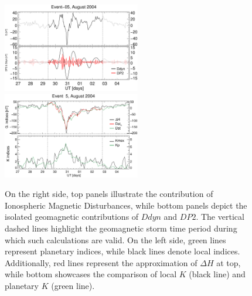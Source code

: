 \documentclass[a4paper,fleqn]{cas-dc}
\begin{document}
\begin{figure}[h!]
       \centerline{\Large \bf   
      \hspace{0.275\textwidth}  \color{black}{}
       \hspace{0.295\textwidth}  \color{black}{}
         \hfill}
    \includegraphics[width=6.0cm]{images/diono/iono_PI_V1_2004-08-27.eps}
    \includegraphics[width=6.0cm]{images/dH_approx/diono_valid_V4_2004-08-27.eps}            
       \caption{On the right side, top panels illustrate the contribution of Ionospheric Magnetic Disturbances, while bottom panels depict the isolated geomagnetic contributions of $Ddyn$ and $DP2$. The vertical dashed lines highlight the geomagnetic storm time period during which such calculations are valid. On the left side, green lines represent planetary indices, while black lines denote local indices. Additionally, red lines represent the approximation of $\Delta H$ at top, while bottom showcases the comparison of local $K$ (black line) and planetary $K$ (green line).
       }
    \label{fig:iono_resp2}
\end{figure}
\end{document}
